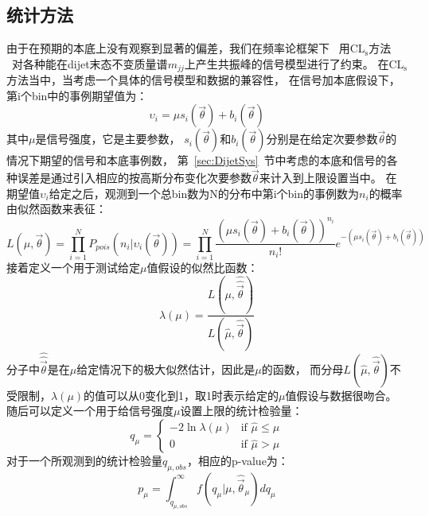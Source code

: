 \subsection{统计方法} 
\label{sec:DijetSig1}
由于在预期的本底上没有观察到显著的偏差，我们在频率论框架下~\cite{Baak:2014wma}
用CL$_\text{s}$方法 ~\cite{Read:2002hq}对各种能在dijet末态不变质量谱$m_{jj}$上产生共振峰的信号模型进行了约束。
在CL$_\text{s}$方法当中，当考虑一个具体的信号模型和数据的兼容性，
在信号加本底假设下，第i个bin中的事例期望值为：
\begin{equation} 
\label{eq:Limit1}
\upsilon_i=\mu s_i(\vec{\theta}) + b_i (\vec{\theta})
\end{equation}
其中$\mu$是信号强度，它是主要参数，
$s_i(\vec{\theta})$和$b_i (\vec{\theta})$分别是在给定次要参数$\vec{\theta}$的情况下期望的信号和本底事例数，
第~\ref{sec:DijetSys}~节中考虑的本底和信号的各种误差是通过引入相应的按高斯分布变化次要参数$\vec{\theta}$来计入到上限设置当中。
在期望值$\upsilon_i$给定之后，观测到一个总bin数为N的分布中第i个bin的事例数为$n_i$的概率由似然函数来表征：
\begin{equation} 
\label{eq:Limit2}
L(\mu,\vec{\theta})= \prod^N_{i=1} P_{pois}(n_i|\upsilon_i(\vec{\theta})) 
=\prod^N_{i=1} \frac{(\mu s_i(\vec{\theta}) + b_i (\vec{\theta}))^{n_i}}{n_i !} e^{-(\mu s_i(\vec{\theta}) + b_i (\vec{\theta}))}
\end{equation}
接着定义一个用于测试给定$\mu$值假设的似然比函数：
\begin{equation} 
\label{eq:Limit3}
\lambda(\mu)=\frac{L(\mu,\hat{\hat{\vec{\theta}}})}{L(\hat{\mu},\hat{\vec{\theta}})}
\end{equation}
分子中$\hat{\hat{\vec{\theta}}}$是在$\mu$给定情况下的极大似然估计，因此是$\mu$的函数，
而分母$L(\hat{\mu},\hat{\vec{\theta}})$不受限制，$\lambda(\mu)$的值可以从0变化到1，取1时表示给定的$\mu$值假设与数据很吻合。
随后可以定义一个用于给信号强度$\mu$设置上限的统计检验量：
\begin{equation} 
\label{eq:Limit4}
q_{\mu} =
    \begin{cases}
      -2\ln \lambda(\mu) & \text{if $\hat{\mu} \le \mu$} \\
      0 & \text{if $\hat{\mu} > \mu$}
    \end{cases}  
\end{equation}
对于一个所观测到的统计检验量$q_{\mu,obs}$，相应的p-value为：
\begin{equation} 
\label{eq:Limit5}
p_{\mu}=\int^{\infty}_{q_{\mu,obs}} f\left(   q_{\mu}|\mu, \hat{\vec{\theta}}_{\mu}   \right) dq_{\mu}
\end{equation}
